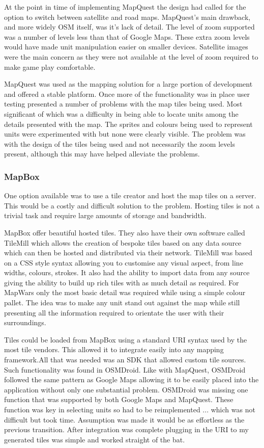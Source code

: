 At the point in time of implementing MapQuest the design had called for the option to switch between satellite and road maps. MapQuest's main drawback, and more widely OSM itself, was it's lack of detail. The level of zoom supported was a number of levels less than that of Google Maps. These extra zoom levels would have made unit manipulation easier on smaller devices. Satellite images were the main concern as they were not available at the level of zoom required to make game play comfortable.

MapQuest was used as the mapping solution for a large portion of development and offered a stable platform. Once more of the functionality was in place user testing presented a number of problems with the map tiles being used. Most significant of which was a difficulty in being able to locate units among the details presented with the map. The sprites and colours being used to represent units were experimented with but none were clearly visible. The problem was with the design of the tiles being used and not necessarily the zoom levels present, although this may have helped alleviate the problems.

\subsubsection*{MapBox}
One option available was to use a tile creator and host the map tiles on a server. This would be a costly and difficult solution to the problem. Hosting tiles is not a trivial task and require large amounts of storage and bandwidth.

MapBox offer beautiful hosted tiles. They also have their own software called TileMill which allows the creation of bespoke tiles based on any data source which can then be hosted and distributed via their network. TileMill was based on a CSS style syntax allowing you to customise any visual aspect, from line widths, colours, strokes. It also had the ability to import data from any source giving the ability to build up rich tiles with as much detail as required. For MapWars only the most basic detail was required while using a simple colour pallet. The idea was to make any unit stand out against the map while still presenting all the information required to orientate the user with their surroundings. 

Tiles could be loaded from MapBox using a standard URI syntax used by the most tile vendors. This allowed it to integrate easily into any mapping framework.All that was needed was an SDK that allowed custom tile sources. Such functionality was found in OSMDroid. Like with MapQuest, OSMDroid followed the same pattern as Google Maps allowing it to be easily placed into the application without only one substantial problem. OSMDroid was missing one function that was supported by both Google Maps and MapQuest. These function was key in selecting units so had to be reimplemented ... which was not difficult but took time. Assumption was made it would be as effortless as the previous transition. After integration was complete plugging in the URI to my generated tiles was simple and worked straight of the bat.

